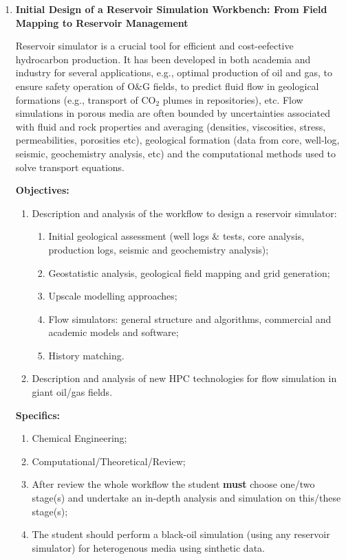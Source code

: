 \documentclass[12pts,a4paper,amsmath,amssymb,floatfix]{article}%
\begin{document}

\begin{enumerate}[label=\bfseries Project \arabic*:]

\item {\bf Initial Design of a Reservoir Simulation Workbench: From Field Mapping to Reservoir Management}

Reservoir simulator is a crucial tool for efficient and cost-eefective hydrocarbon production. It has been developed in both academia and industry for several applications, e.g., optimal production of oil and gas, to ensure safety operation of O$\&$G fields, to predict fluid flow in geological formations (e.g., transport of CO$_{2}$ plumes in repositories), etc. Flow simulations in porous media are often bounded by uncertainties associated with fluid and rock properties and averaging (densities, viscosities, stress, permeabilities, porosities etc), geological formation (data from core, well-log, seismic, geochemistry analysis, etc) and the computational methods used to solve transport equations. 

\noindent
{\bf Objectives:}
\begin{enumerate}
\item Description and analysis of the workflow to design a reservoir simulator:
\begin{enumerate}
\item Initial geological assessment (well logs $\&$ tests, core analysis, production logs, seismic and geochemistry analysis);
\item Geostatistic analysis, geological field mapping and grid generation;
\item Upscale modelling approaches;
\item Flow simulators: general structure and algorithms, commercial and academic models and software;
\item History matching.
\end{enumerate}
\item Description and analysis of new HPC technologies for flow simulation in giant oil/gas fields.
\end{enumerate}

\noindent
{\bf Specifics:} 
\begin{enumerate}
\item Chemical Engineering;
\item Computational/Theoretical/Review;
\item After review the whole workflow the student {\bf must} choose one/two stage(s) and undertake an in-depth analysis and simulation on this/these stage(s);
\item The student should perform a black-oil simulation (using any reservoir simulator) for heterogenous media using sinthetic data.
\end{enumerate}


\end{enumerate}
\end{document}
